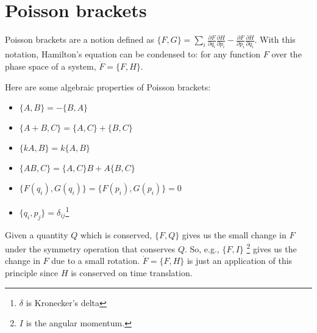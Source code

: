 \documentclass[12pt]{article}
\begin{document}
\section{Poisson brackets}

Poisson brackets are a notion defined as $\{F,G\} = \sum_i \frac{\partial
  F}{\partial q_i} \frac{\partial H}{\partial p_i} - \frac{\partial F}{\partial
  p_i} \frac{\partial H}{\partial q_i}$.  With this notation, Hamilton's
equation can be condensed to: for any function $F$ over the phase space of a
system, $\dot F = \{F,H\}$.

Here are some algebraic properties of Poisson brackets:

\begin{itemize}
\item $\{A,B\} = -\{B,A\}$
\item $\{A+B,C\} = \{A,C\} + \{B,C\}$
\item $\{kA,B\} = k\{A,B\}$
\item $\{AB,C\} = \{A,C\}B + A\{B,C\}$
\item $\{F(q_i),G(q_i)\} = \{F(p_i),G(p_i)\} = 0$
\item $\{q_i, p_j\} = \delta_{i j}$\footnote{$\delta$ is Kronecker's delta}
\end{itemize}

Given a quantity $Q$ which is conserved, $\{F, Q\}$ gives us the small change in
$F$ under the symmetry operation that conserves $Q$.  So, e.g., $\{F,
I\}$ \footnote{$I$ is the angular momentum.} gives us the change in $F$ due to a
small rotation.  $\dot F = \{F,H\}$ is just an application of this principle
since $H$ is conserved on time translation.
\end{document}

